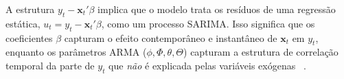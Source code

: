 \documentclass[ 12pt,a4paper ]{article} %
\begin{document}
		A estrutura $y_t - \mathbf{x}_t'\beta$ implica que o modelo trata os resíduos de uma regressão estática, $u_t = y_t - \mathbf{x}_t'\beta$, como um processo SARIMA. Isso significa que os coeficientes $\beta$ capturam o efeito contemporâneo e instantâneo de $\mathbf{x}_t$ em $y_t$, enquanto os parâmetros ARMA ($\phi, \Phi, \theta, \Theta$) capturam a estrutura de correlação temporal da parte de $y_t$ que \textit{não} é explicada pelas variáveis exógenas ~\cite{statsmodels}.
	
	
%		
%		
%		
%		
%		
%		
%		
%		
%		
%		
%		
%		
%		
%		
%		
%		
%		
%		
\end{document}

